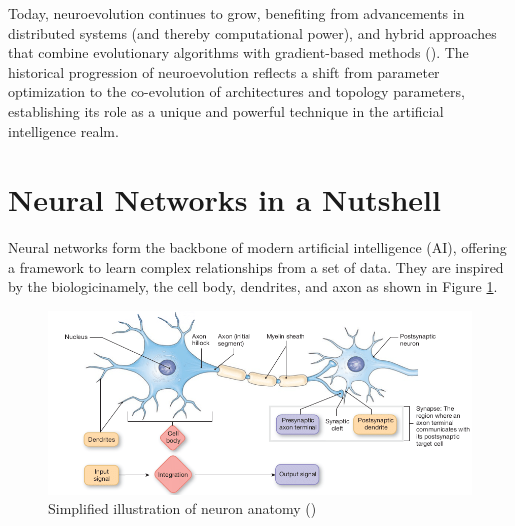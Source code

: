 \noindent Today, neuroevolution continues to grow, benefiting from advancements in distributed systems (and thereby computational power), and hybrid approaches that combine evolutionary algorithms with gradient-based methods (\cite{asseman2021accelerating}). The historical progression of neuroevolution reflects a shift from parameter optimization to the co-evolution of architectures and topology parameters, establishing its role as a unique and powerful technique in the artificial intelligence realm.

\section{Neural Networks in a Nutshell}\label{sec:nn_nutshell}
Neural networks form the backbone of modern artificial intelligence (AI), offering a framework to learn complex relationships from a set of data. They are inspired by the biologicinamely, the cell body, dendrites, and axon as shown in Figure \ref{fig:ne_biological_neuron}.

\begin{figure}[H] %
	\centering %
	\includegraphics[width=\textwidth]{Figures/chapter_ne/biological_neuron.png} %
	\caption{Simplified illustration of neuron anatomy (\cite{neuron_model})}
	\label{fig:ne_biological_neuron} %
\end{figure}

